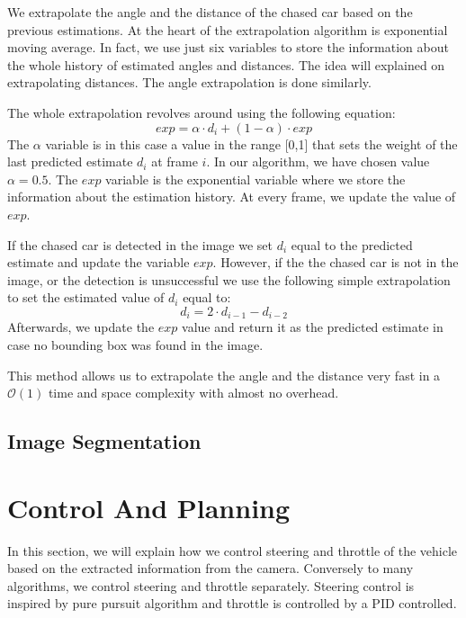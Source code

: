 We extrapolate the angle and the distance of the chased car based on the previous estimations. At the heart of the extrapolation algorithm is exponential moving average. In fact, we use just six variables to store the information about the whole history of estimated angles and distances. The idea will explained on extrapolating distances. The angle extrapolation is done similarly. \par
The whole extrapolation revolves around using the following equation:
\begin{equation}
exp = \alpha\cdot d_i + (1-\alpha)\cdot exp
\end{equation}
The $\alpha$ variable is in this case a value in the range [0,1] that sets the weight of the last predicted estimate $d_i$ at frame $i$. In our algorithm, we have chosen value $\alpha=0.5$. The $exp$ variable is the exponential variable where we store the information about the estimation history. At every frame, we update the value of $exp$. \par

If the chased car is detected in the image we set $d_i$ equal to the predicted estimate and update the variable $exp$.
However, if the the chased car is not in the image, or the detection is unsuccessful we use the following simple extrapolation to set the estimated value of $d_i$ equal to:
\begin{equation}
d_i = 2\cdot d_{i-1} - d_{i-2}
\end{equation}
Afterwards, we update the $exp$ value and return it as the predicted estimate in case no bounding box was found in the image. 
\par This method allows us to extrapolate the angle and the distance very fast in a $\mathcal{O}(1)$ time and space complexity with almost no overhead.

\subsection{Image Segmentation}


\section{Control And Planning}
In this section, we will explain how we control steering and throttle of the vehicle based on the extracted information from the camera. Conversely to many algorithms, we control steering and throttle separately. Steering control is inspired by pure pursuit algorithm and throttle is controlled by a PID controlled.


